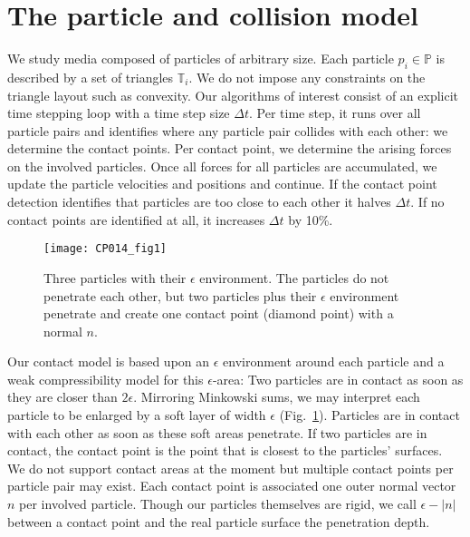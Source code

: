 

\section{The particle and collision model}
\label{section:model}

%
% 
We study media composed of particles of arbitrary size.
Each particle $p_i \in \mathbb{P}$ is described  by a set of
triangles $\mathbb{T}_i$.
We do not impose any constraints on the triangle layout such as convexity.
Our algorithms of interest consist of an explicit time stepping loop with a time
step size $\Delta t$.
Per time step, it runs over all particle pairs and identifies where any
particle pair collides with each other: we determine the contact points.
Per contact point, we determine the arising forces on the involved particles.
Once all forces for all particles are accumulated, we update the particle velocities
and positions and continue.
If the contact point detection identifies that particles are too close to each
other it halves $\Delta t$.
If no contact points are identified at all, it increases $\Delta t$ by 10\%.

\begin{figure}[htb]
  \begin{center}
    \texttt{[image: CP014\_fig1]}
  \end{center}
  \vspace{-0.6cm}
  \caption{
    Three particles with their $\epsilon $ environment. The particles do
    not penetrate each other, but two particles plus their $\epsilon $
    environment penetrate and create one contact point (diamond point) with a normal $n$. 
  }
  \label{figure:minkowski}
  \vspace{-0.4cm}
\end{figure}


%
%
%
Our contact model is based upon an $\epsilon$ environment around each
particle and a weak compressibility model for this $\epsilon$-area:
Two particles are in contact as soon as they are closer than $2\epsilon$.
Mirroring Minkowski sums, we may interpret each particle to be enlarged by a
soft layer of width $\epsilon$ (Fig.~\ref{figure:minkowski}).
Particles are in contact with each other as soon as these soft areas penetrate.
If two particles are in contact, the contact point is the point that is closest
to the particles' surfaces.
We do not support contact areas at the moment but multiple contact points per
particle pair may exist.
Each contact point is associated one outer normal vector $n$ per involved
particle.
Though our particles themselves are rigid, we call $\epsilon-|n|$ between a contact point and the real particle surface the penetration depth.


